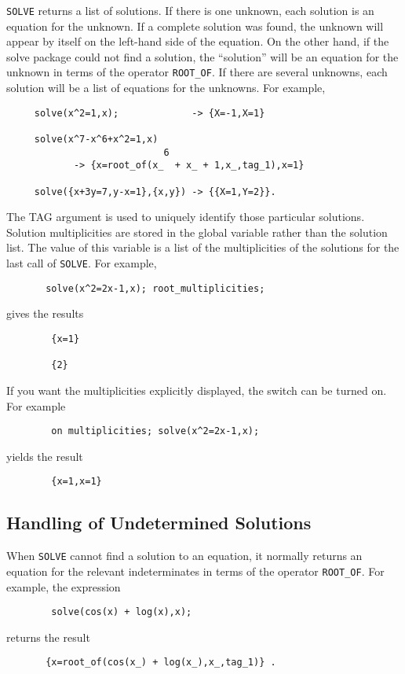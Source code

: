 \hypertarget{operator:ROOT_OF}{}
\texttt{SOLVE} returns a list of solutions.  If there is one unknown, each
solution is an equation for the unknown.  If a complete solution was
found, the unknown will appear by itself on the left-hand side of the
equation.  On the other hand, if the solve package could not find a
solution, the ``solution'' will be an equation for the unknown in terms
of the operator \texttt{ROOT\_OF}. If there
are several unknowns, each solution will be a list of equations for the
unknowns.  For example,
\begin{verbatim}
     solve(x^2=1,x);             -> {X=-1,X=1}

     solve(x^7-x^6+x^2=1,x)
                            6
            -> {x=root_of(x_  + x_ + 1,x_,tag_1),x=1}

     solve({x+3y=7,y-x=1},{x,y}) -> {{X=1,Y=2}}.
\end{verbatim}
\hypertarget{reserved:ROOT_MULTIPLICITIES}{}
The TAG argument is used to uniquely identify those particular solutions.
Solution multiplicities are stored in the global variable
 rather than the solution list.  The value of this
variable is a list of the multiplicities of the solutions for the last
call of \texttt{SOLVE}.  For example,
\begin{verbatim}
       solve(x^2=2x-1,x); root_multiplicities;
\end{verbatim}
gives the results
\begin{verbatim}
        {x=1}

        {2}
\end{verbatim}

\hypertarget{switch:MULTIPLICITIES}{}
If you want the multiplicities explicitly displayed, the switch
 can be turned on. For example
\begin{verbatim}
        on multiplicities; solve(x^2=2x-1,x);
\end{verbatim}
yields the result
\begin{verbatim}
        {x=1,x=1}
\end{verbatim}

\subsection{Handling of Undetermined Solutions}
When \texttt{SOLVE} cannot find a solution to an equation, it normally
returns an equation for the relevant indeterminates in terms of the
operator \texttt{ROOT\_OF}.  For example, the expression
\begin{verbatim}
        solve(cos(x) + log(x),x);
\end{verbatim}
returns the result
\begin{verbatim}
       {x=root_of(cos(x_) + log(x_),x_,tag_1)} .
\end{verbatim}

